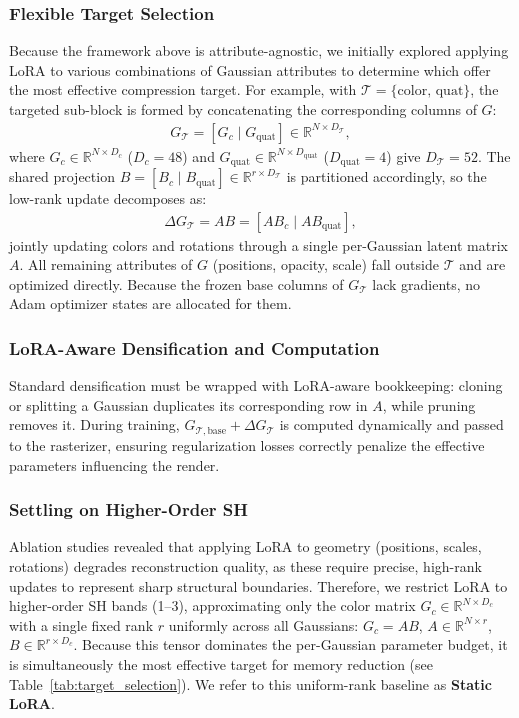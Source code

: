 \documentclass[sigconf]{acmart}
\begin{document}
\subsubsection{Flexible Target Selection}
Because the framework above is attribute-agnostic, we initially explored
applying LoRA to various combinations of Gaussian attributes to determine which
offer the most effective compression target. For example, with
$\mathcal{T} = \{\text{color, quat}\}$, the targeted sub-block is formed by
concatenating the corresponding columns of $G$:
\begin{align}
  G_{\mathcal{T}} = [G_c \mid G_{\text{quat}}] \in \mathbb{R}^{N \times D_{\mathcal{T}}},
\end{align}
where $G_c \in \mathbb{R}^{N \times D_c}$ ($D_c = 48$) and
$G_{\text{quat}} \in \mathbb{R}^{N \times D_{\text{quat}}}$ ($D_{\text{quat}} = 4$) give $D_{\mathcal{T}} = 52$.
The shared projection $B = [B_c \mid B_{\text{quat}}] \in \mathbb{R}^{r \times D_{\mathcal{T}}}$
is partitioned accordingly, so the low-rank update decomposes as:
\begin{align}
  \Delta G_{\mathcal{T}} = AB = [AB_c \mid AB_{\text{quat}}],
\end{align}
jointly updating colors and rotations through a single per-Gaussian latent
matrix $A$. All remaining attributes of $G$ (positions, opacity, scale) fall
outside $\mathcal{T}$ and are optimized directly. Because the frozen base
columns of $G_{\mathcal{T}}$ lack gradients, no Adam optimizer states are
allocated for them.

\subsubsection{LoRA-Aware Densification and Computation}
Standard densification must be wrapped with LoRA-aware bookkeeping: cloning or 
splitting a Gaussian duplicates its corresponding row in $A$, while pruning 
removes it. During training, $G_{\mathcal{T},\text{base}} + \Delta G_{\mathcal{T}}$ is
computed dynamically and passed to the rasterizer, ensuring regularization
losses correctly penalize the effective parameters influencing the render.

\subsubsection{Settling on Higher-Order SH}
Ablation studies revealed that applying LoRA to geometry (positions, scales,
rotations) degrades reconstruction quality, as these require precise, high-rank
updates to represent sharp structural boundaries. Therefore, we restrict LoRA
to higher-order SH bands (1--3), approximating only the color matrix
$G_c \in \mathbb{R}^{N \times D_c}$ with a single fixed rank $r$ uniformly
across all Gaussians: $G_c = AB$, $A \in \mathbb{R}^{N \times r}$,
$B \in \mathbb{R}^{r \times D_c}$. Because this tensor dominates the
per-Gaussian parameter budget, it is simultaneously the most effective target
for memory reduction (see Table~\ref{tab:target_selection}). We refer to this
uniform-rank baseline as \textbf{Static LoRA}.
\end{document}
